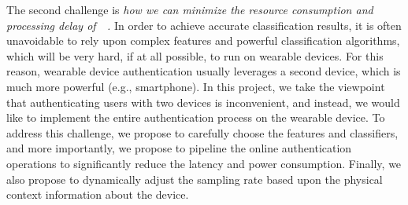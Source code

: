 The second challenge is \emph{how we can minimize the resource consumption and processing delay of~\systemname~.} In order to achieve accurate classification results, it is often unavoidable to rely upon complex features and powerful classification algorithms, which will be very hard, if at all possible, to run on wearable devices. For this reason, wearable device authentication usually leverages a second device, which is much more powerful (e.g., smartphone). In this project, we take the viewpoint that authenticating users with two devices is inconvenient, and instead, we would like to implement the entire authentication process on the wearable device. To address this challenge, we propose to carefully choose the features and classifiers, and more importantly, we propose to pipeline the online authentication operations to significantly reduce the latency and power consumption. Finally, we also propose to dynamically adjust the sampling rate based upon the physical context information about the device.
